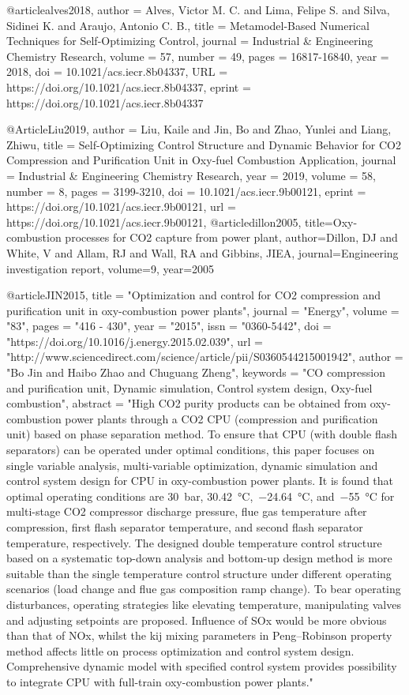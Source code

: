 @article{alves2018,
author = {Alves, Victor
M. C. and Lima, Felipe S. and Silva, Sidinei K. and Araujo, Antonio C. B.},
title = {Metamodel-Based Numerical Techniques for Self-Optimizing Control},
journal = {Industrial \& Engineering Chemistry Research},
volume = {57},
number = {49},
pages = {16817-16840},
year = {2018},
doi = {10.1021/acs.iecr.8b04337},
URL = {https://doi.org/10.1021/acs.iecr.8b04337},
eprint = {https://doi.org/10.1021/acs.iecr.8b04337}
}

@Article{Liu2019,
  author  = {Liu, Kaile and Jin, Bo and Zhao, Yunlei and Liang, Zhiwu},
  title   = {Self-Optimizing Control Structure and Dynamic Behavior for CO2 Compression and Purification Unit in Oxy-fuel Combustion Application},
  journal = {Industrial \& Engineering Chemistry Research},
  year    = {2019},
  volume  = {58},
  number  = {8},
  pages   = {3199-3210},
  doi     = {10.1021/acs.iecr.9b00121},
  eprint  = {https://doi.org/10.1021/acs.iecr.9b00121},
  url     = {https://doi.org/10.1021/acs.iecr.9b00121},
}
@article{dillon2005,
	title={Oxy-combustion processes for CO2 capture from power plant},
	author={Dillon, DJ and White, V and Allam, RJ and Wall, RA and Gibbins, JIEA},
	journal={Engineering investigation report},
	volume={9},
	year={2005}
}

@article{JIN2015,
	title = "Optimization and control for CO2 compression and purification unit in oxy-combustion power plants",
	journal = "Energy",
	volume = "83",
	pages = "416 - 430",
	year = "2015",
	issn = "0360-5442",
	doi = "https://doi.org/10.1016/j.energy.2015.02.039",
	url = "http://www.sciencedirect.com/science/article/pii/S0360544215001942",
	author = "Bo Jin and Haibo Zhao and Chuguang Zheng",
	keywords = "CO compression and purification unit, Dynamic simulation, Control system design, Oxy-fuel combustion",
	abstract = "High CO2 purity products can be obtained from oxy-combustion power plants through a CO2 CPU (compression and purification unit) based on phase separation method. To ensure that CPU (with double flash separators) can be operated under optimal conditions, this paper focuses on single variable analysis, multi-variable optimization, dynamic simulation and control system design for CPU in oxy-combustion power plants. It is found that optimal operating conditions are 30 bar, 30.42 °C, −24.64 °C, and −55 °C for multi-stage CO2 compressor discharge pressure, flue gas temperature after compression, first flash separator temperature, and second flash separator temperature, respectively. The designed double temperature control structure based on a systematic top-down analysis and bottom-up design method is more suitable than the single temperature control structure under different operating scenarios (load change and flue gas composition ramp change). To bear operating disturbances, operating strategies like elevating temperature, manipulating valves and adjusting setpoints are proposed. Influence of SOx would be more obvious than that of NOx, whilst the kij mixing parameters in Peng–Robinson property method affects little on process optimization and control system design. Comprehensive dynamic model with specified control system provides possibility to integrate CPU with full-train oxy-combustion power plants."
}

